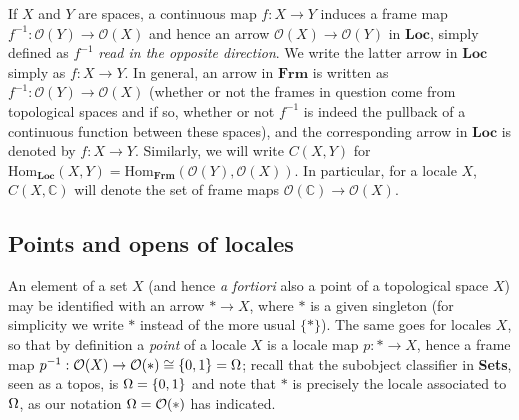 \documentclass[11pt]{article}
\newcommand{\Sets}{\mbox{\textbf{Sets}}}
\newcommand{\raw}{\rightarrow} \newcommand{\rat}{\mapsto}
\newcommand{\inv}{^{-1}}
\newcommand{\CO}{{\mathcal O}} \newcommand{\CP}{{\mathcal P}}
\newcommand{\C}{{\mathbb C}} \newcommand{\D}{{\mathbb D}}
\begin{document}
If $X$ and $Y$ are spaces, a continuous
map $f:X\raw Y$ induces a frame map $f\inv:  \CO(Y)\raw \CO(X)$ and hence an arrow
$\CO(X)\raw \CO(Y)$ in $\mathbf{Loc}$, simply defined as
$f\inv$ {\it read in the opposite direction}. We write the latter arrow in $\mathbf{Loc}$
simply as $f:X\raw Y$. In general, an arrow in $\mathbf{Frm}$ is written
as $f\inv:  \CO(Y)\raw \CO(X)$ (whether or not the frames in question come from topological spaces and if so, whether or not $f\inv$ is indeed the pullback of a continuous function between these spaces), and the corresponding arrow in $\mathbf{Loc}$ is denoted by $f:X\raw Y$.
 Similarly,  we will write $C(X,Y)$
 for $\mathrm{Hom}_{\mathbf{Loc}}(X,Y)=\mathrm{Hom}_{\mathbf{Frm}}(\CO(Y),\CO(X))$.
 In particular, for a locale $X$, $C(X,\C)$
 will denote the set of frame maps $\CO(\C)\raw \CO(X)$.
 \subsection{Points and opens of locales}\label{subsection:locale2}
An element of a set $X$ (and hence {\it a fortiori} also a point of a topological space $X$)
may be identified with an arrow $*\raw X$, where $*$ is a given singleton (for simplicity we write $*$ instead of the more usual $\{*\}$). The same goes for locales $X$, so that by definition a {\it point} of a locale $X$ is  a locale map  $p:*\raw X$, hence a frame map
$p\inv: \CO(X)\raw\CO(*)\cong\{0,1\}=\Om$; recall that the subobject classifier in \Sets, seen as a topos, is $\Omega=\{0,1\}$ and note that $*$ is precisely the locale associated to $\Omega$, as our notation $\Om=\CO(*)$ has indicated.
\end{document}
